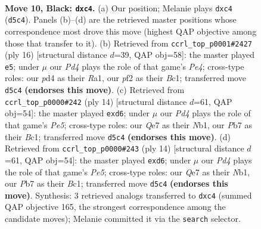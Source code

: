 \documentclass[11pt]{article}
\begin{document}
\clearpage

\begin{figure}[p]\centering
\begin{subfigure}{0.46\textwidth}\centering
\resizebox{\linewidth}{!}{%
\newchessgame
\chessboard[
  setfen={r1b1r1k1/ppp1qppp/2n1pn2/3p4/2PP3P/4PNP1/PP1B1P2/R2QKB1R b KQ - 1 10},
  showmover=false,
  pgfstyle=straightmove, color=movearrow, markmove={d5-c4}
]}
\caption{}
\end{subfigure}\hfill
\begin{subfigure}{0.46\textwidth}\centering
\resizebox{\linewidth}{!}{%
\newchessgame
\chessboard[
  setfen={r1bqk2r/p3bppp/2p1pn2/2pp4/4PP2/2NP1N2/PPP3PP/R1BQ1RK1 w kq - 2 9},
  showmover=false,
  pgfstyle=straightmove, color=movearrow, markmove={e4-e5}
]}
\caption{}
\end{subfigure}
\\[4pt]
\begin{subfigure}{0.46\textwidth}\centering
\resizebox{\linewidth}{!}{%
\newchessgame
\chessboard[
  setfen={r1bqkb1r/p4ppp/2ppp1n1/2p1P3/8/1P3N2/P1PP1PPP/RNBQ1RK1 w kq - 1 8},
  showmover=false,
  pgfstyle=straightmove, color=movearrow, markmove={e5-d6}
]}
\caption{}
\end{subfigure}\hfill
\begin{subfigure}{0.46\textwidth}\centering
\resizebox{\linewidth}{!}{%
\newchessgame
\chessboard[
  setfen={r1bqkb1r/p4ppp/2ppp1n1/2p1P3/8/1P3N2/P1PP1PPP/RNBQ1RK1 w kq - 1 8},
  showmover=false,
  pgfstyle=straightmove, color=movearrow, markmove={e5-d6}
]}
\caption{}
\end{subfigure}
\caption{\textbf{Move 10, Black: \texttt{dxc4}.} (a) Our position; Melanie plays \texttt{dxc4} (\texttt{d5c4}). Panels (b)--(d) are the retrieved master positions whose correspondence most drove this move (highest QAP objective among those that transfer to it). (b) Retrieved from \texttt{ccrl\_top\_p0001\#2427} (ply 16) [structural distance $d$=39, QAP obj=58]: the master played \texttt{e5}; under $\mu$ our \emph{Pd4} plays the role of that game's \emph{Pe4}; cross-type roles: our \emph{p}d4 as their \emph{R}a1, our \emph{p}f2 as their \emph{B}c1; transferred move \texttt{d5c4} \textbf{(endorses this move)}. (c) Retrieved from \texttt{ccrl\_top\_p0000\#242} (ply 14) [structural distance $d$=61, QAP obj=54]: the master played \texttt{exd6}; under $\mu$ our \emph{Pd4} plays the role of that game's \emph{Pe5}; cross-type roles: our \emph{Q}e7 as their \emph{N}b1, our \emph{P}b7 as their \emph{B}c1; transferred move \texttt{d5c4} \textbf{(endorses this move)}. (d) Retrieved from \texttt{ccrl\_top\_p0000\#243} (ply 14) [structural distance $d$=61, QAP obj=54]: the master played \texttt{exd6}; under $\mu$ our \emph{Pd4} plays the role of that game's \emph{Pe5}; cross-type roles: our \emph{Q}e7 as their \emph{N}b1, our \emph{P}b7 as their \emph{B}c1; transferred move \texttt{d5c4} \textbf{(endorses this move)}. Synthesis: 3 retrieved analogs transferred to \texttt{dxc4} (summed QAP objective 165, the strongest correspondence among the candidate moves); Melanie committed it via the \texttt{search} selector.}
\label{fig:thought-m19}
\end{figure}
\end{document}
